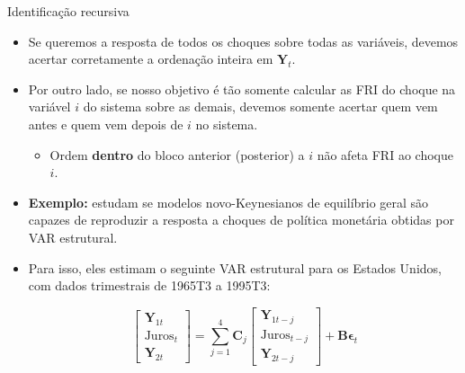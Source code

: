 \documentclass[11pt]{beamer}
\begin{document}
\begin{frame}{Identificação recursiva}
	\begin{itemize}
		\item Se queremos a resposta de todos os choques sobre todas as variáveis, devemos acertar corretamente a ordenação inteira em $\boldsymbol{Y}_t$.
		\item Por outro lado, se nosso objetivo é tão somente calcular as FRI do choque na variável $i$ do sistema sobre as demais, devemos somente acertar quem vem antes e quem vem depois de $i$ no sistema.
		\begin{itemize}
			\item Ordem \textbf{dentro} do bloco anterior (posterior) a $i$ não afeta FRI ao choque $i$.
		\end{itemize}
		\item \textbf{Exemplo:} \citet{Christiano2005} estudam  se modelos novo-Keynesianos de equilíbrio geral são capazes de reproduzir a resposta a choques de política monetária obtidas por VAR estrutural.
		\item Para isso, eles estimam o seguinte VAR estrutural para os Estados Unidos, com dados trimestrais de 1965T3 a 1995T3:
		
		$$\begin{bmatrix}
			\boldsymbol{Y}_{1t} \\
			\text{Juros}_{t} \\
				\boldsymbol{Y}_{2t}
		\end{bmatrix} = \sum_{j=1}^4 \boldsymbol{C}_j \begin{bmatrix}
		\boldsymbol{Y}_{1t-j} \\
		\text{Juros}_{t-j} \\
		\boldsymbol{Y}_{2t-j}
		\end{bmatrix} + \boldsymbol{B}\boldsymbol{\epsilon}_t$$
		
	\end{itemize}
\end{frame}
\end{document}
